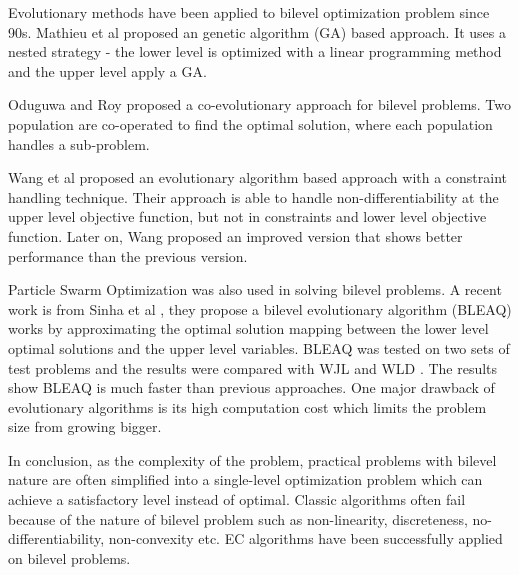 Evolutionary methods have been applied to bilevel optimization problem since 90s. Mathieu et al \cite{Mathieu:2011dw} proposed an genetic algorithm (GA) based approach. It uses a nested strategy - the lower level is optimized with a linear programming method and the upper level apply a GA.

Oduguwa and Roy \cite{Oduguwa:2002kr} proposed a co-evolutionary approach for bilevel problems. Two population are co-operated to find the optimal solution, where each population handles a sub-problem. 

Wang et al \cite{Wang:2005fa} proposed an evolutionary algorithm based approach with a constraint handling technique.  Their approach is able to handle non-differentiability at the upper level objective function, but not in constraints and lower  level objective function.
Later on, Wang proposed an improved version \cite{Wang:2011di} that shows better performance than the previous version.

Particle Swarm Optimization \cite{Li:2006br} was also used in solving bilevel problems.
A recent work is from Sinha et al \cite{Sinha:2013tn}, they propose a bilevel evolutionary algorithm (BLEAQ) works by approximating the optimal solution mapping between the lower level optimal solutions and the upper level variables.  BLEAQ was tested on two sets of test problems and the results were compared with WJL \cite{Wang:2005fa} and WLD \cite{Wang:2011di}. The results show BLEAQ is much faster than previous approaches.
One major drawback of evolutionary algorithms is its high computation cost which limits the problem size from growing bigger.

In conclusion, as the complexity of the problem, practical problems with bilevel nature are often simplified into a single-level optimization problem which can achieve a satisfactory level instead of optimal. Classic algorithms often fail because of the nature of bilevel problem such as non-linearity, discreteness, no-differentiability, non-convexity etc. EC algorithms have been successfully applied on bilevel problems.






